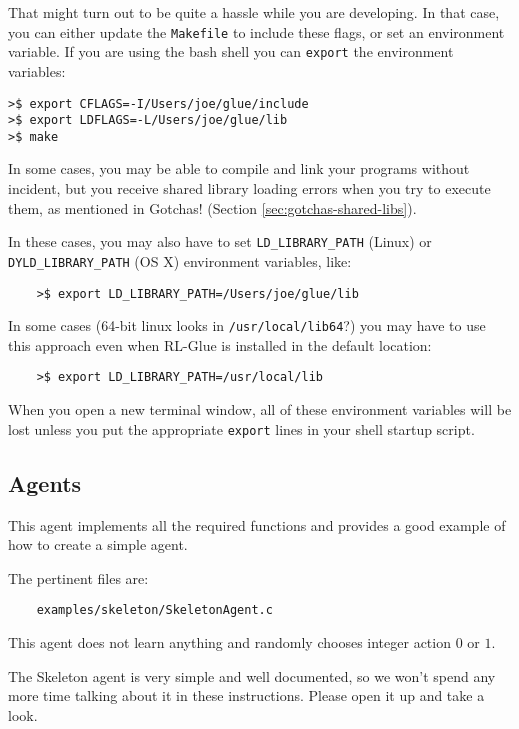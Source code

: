 \documentclass[11pt]{article}
\begin{document}
That might turn out to be quite a hassle while you are developing.  In that case, you can either update the \texttt{Makefile} to include these flags, 
or set an environment variable.  If you are using the bash shell you can \texttt{export} the environment variables:
\begin{verbatim}
>$ export CFLAGS=-I/Users/joe/glue/include
>$ export LDFLAGS=-L/Users/joe/glue/lib
>$ make
\end{verbatim}

In some cases, you may be able to compile and link your programs without incident, but you receive shared library loading errors when you try to execute them, as mentioned in Gotchas! (Section \ref{sec:gotchas-shared-libs}).

In these cases, you may also have to set \texttt{LD\_LIBRARY\_PATH} (Linux) or \texttt{DYLD\_LIBRARY\_PATH} (OS X) environment variables, like:
\begin{verbatim}
	>$ export LD_LIBRARY_PATH=/Users/joe/glue/lib
\end{verbatim}

In some cases (64-bit linux looks in \texttt{/usr/local/lib64}?) you may have to use this approach even when RL-Glue is installed in the default location:
\begin{verbatim}
	>$ export LD_LIBRARY_PATH=/usr/local/lib
\end{verbatim}

When you open a new terminal window, all of these environment variables will be lost unless you put the appropriate \texttt{export} lines in your shell startup script.




\subsection{Agents}
\label{sec:agent}
This agent implements all the required functions and provides a good example of how to create a simple agent.

The pertinent files are:
\begin{verbatim}
	examples/skeleton/SkeletonAgent.c
\end{verbatim}

This agent does not learn anything and randomly chooses integer action $0$ or $1$.

The Skeleton agent is very simple and well documented, so we won't spend any more time talking about it in these instructions.
Please open it up and take a look.
\end{document}
